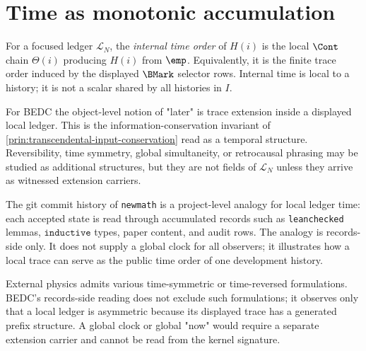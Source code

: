 \section{Time as monotonic accumulation}
\label{sec:consciousness-universe-time-as-accumulation}

\begin{definition}
\label{def:consciousness-universe-bedc-time}
For a focused ledger $\mathcal{L}_N$, the \emph{internal time order} of $H(i)$ is the local $\Cont$ chain $\Theta(i)$ producing $H(i)$ from $\emp$. Equivalently, it is the finite trace order induced by the displayed $\BMark$ selector rows. Internal time is local to a history; it is not a scalar shared by all histories in $I$.
\end{definition}

\begin{principle}
\label{prin:consciousness-universe-time-is-accumulation}
For BEDC the object-level notion of "later" is trace extension inside a displayed local ledger. This is the information-conservation invariant of \autoref{prin:transcendental-input-conservation} read as a temporal structure. Reversibility, time symmetry, global simultaneity, or retrocausal phrasing may be studied as additional structures, but they are not fields of $\mathcal{L}_N$ unless they arrive as witnessed extension carriers.
\end{principle}

\begin{example}
\label{ex:consciousness-universe-commit-history-time}
The git commit history of \texttt{newmath} is a project-level analogy for local ledger time: each accepted state is read through accumulated records such as \texttt{leanchecked} lemmas, $\texttt{inductive}$ types, paper content, and audit rows. The analogy is records-side only. It does not supply a global clock for all observers; it illustrates how a local trace can serve as the public time order of one development history.
\end{example}

\begin{remark}
\label{rem:consciousness-universe-time-one-direction}
External physics admits various time-symmetric or time-reversed formulations. BEDC's records-side reading does not exclude such formulations; it observes only that a local ledger is asymmetric because its displayed trace has a generated prefix structure. A global clock or global "now" would require a separate extension carrier and cannot be read from the kernel signature.
\end{remark}

